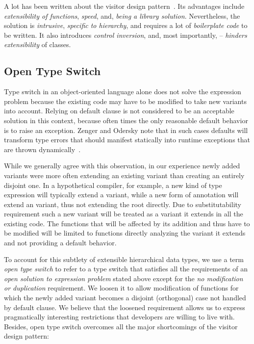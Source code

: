 A lot has been written about the visitor design pattern~\cite{DesignPatterns1993,Palsberg98,Zenger:2001,Oliveira08}. 
Its advantages include \emph{extensibility of functions}, \emph{speed}, and, 
\emph{being a library solution}. Nevertheless, the solution is \emph{intrusive}, 
\emph{specific to hierarchy}, and requires a lot of \emph{boilerplate code} to 
be written. It also introduces \emph{control inversion}, and, most importantly, 
-- \emph{hinders extensibility} of classes.


\subsection{Open Type Switch}

Type switch in an object-oriented language alone 
does not solve the expression problem because the existing code may have to be 
modified to take new variants into account. Relying on default clause is not 
considered to be an acceptable solution in this context, because often times the 
only reasonable default behavior is to raise an exception. Zenger and Odersky 
note that in such cases defaults will transform type errors that should manifest 
statically into runtime exceptions that are thrown dynamically~\cite{fool12}.

While we generally agree with this observation, 
in our experience newly added variants were more often extending an existing 
variant than creating an entirely disjoint one. In a hypothetical compiler, for 
example, a new kind of type expression will typically extend a 
 variant, while a new form of annotation will extend an 
 variant, thus not extending the root  directly. 
Due to substitutability requirement such a new variant will be treated as a 
variant it extends in all the existing code. The functions that will be affected 
by its addition and thus have to be modified will be limited to functions 
directly analyzing the variant it extends and not providing a default behavior.

To account for this subtlety of extensible hierarchical data types, we use a 
term \emph{open type switch} to refer to a type switch that satisfies all the 
requirements of an \emph{open solution to expression problem} stated above 
except for the \emph{no modification or duplication} requirement. We loosen it 
to allow modification of functions for which the newly added variant becomes a 
disjoint (orthogonal) case not handled by default clause. We believe that the 
loosened requirement allows us to express pragmatically interesting restrictions 
that developers are willing to live with. Besides, open type switch overcomes 
all the major shortcomings of the visitor design pattern:

